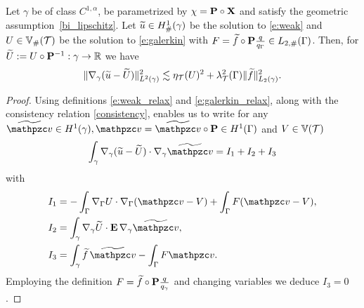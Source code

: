 \begin{theorem}\label{t:posteriori_generic}
  Let $\gamma$ be of class $C^{1,\alpha}$, be parametrized by $\chi = {\bf P} \circ {\bf X}$
  and satisfy the geometric assumption~\eqref{bi_lipschitz}.
Let $\widetilde{u} \in H^1_\#(\gamma)$ be the solution to \eqref{e:weak} and $U \in \mathbb{V}_\#(\mathcal{T})$ be the solution to \eqref{e:galerkin} with $F = \widetilde{f} \circ {\bf P} { q\over q_\Gamma} \in L_{2,\#}(\Gamma)$.
Then, for $\widetilde{U}:=U\circ{\bf P}^{-1}:\gamma\to\mathbb{R}$ we have
$$
\| \nabla_\gamma (\widetilde{u}- \widetilde U) \|_{L^2(\gamma)}^2 \lesssim \eta_{\mathcal{T}}(U)^2
+ \lambda^2_{\mathcal{T}}(\Gamma) \| \widetilde{f} \|_{L_2(\gamma)}^2.
$$
%
\end{theorem}
\begin{proof}
Using definitions \eqref{e:weak_relax} and \eqref{e:galerkin_relax},
along with the consistency relation \eqref{consistency},
enables us to write for any $\widetilde{\tv}\in H^1(\gamma),
\tv=\widetilde\tv\circ\bP\in H^1(\Gamma)$ and $V\in \mathbb V(\mathcal{T})$
%
\begin{equation}\label{e:post_split}
\int_\gamma \nabla_\gamma (\wu-\widetilde U) \cdot \nabla_\gamma \widetilde\tv = I_1+I_2+I_3
\end{equation}
with
\begin{align*}
I_1 & = -\int_\Gamma \nabla_\Gamma U \cdot \nabla_\Gamma (\tv-V) +\int_\Gamma F(\tv-V),
\\
I_2 & = \int_\gamma \nabla_\gamma \widetilde{U} \cdot \bE \, \nabla_\gamma \widetilde{\tv},
\\
I_3 & = \int_\gamma \wf \, \widetilde\tv-\int_\Gamma F \tv.
\end{align*}
%
Employing the definition $F =  \widetilde{f}\circ{\bf P} { q \over q_\gamma }$ and changing
variables we deduce $I_3 = 0$.


\end{proof}

